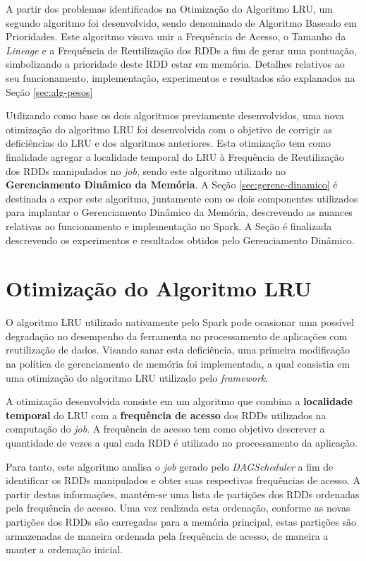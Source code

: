 A partir dos problemas identificados na Otimização do Algoritmo LRU, um segundo algoritmo foi desenvolvido, sendo denominado de Algoritmo Baseado em Prioridades. Este algoritmo visava unir a Frequência de Acesso, o Tamanho da \textit{Lineage} e a Frequência de Reutilização dos RDDs a fim de gerar uma pontuação, simbolizando a prioridade deste RDD estar em memória. Detalhes relativos ao seu funcionamento, implementação, experimentos e resultados são explanados na Seção \ref{sec:alg-pesos}

Utilizando como base os dois algoritmos previamente desenvolvidos, uma nova otimização do algoritmo LRU foi desenvolvida com o objetivo de corrigir as deficiências do LRU e dos algoritmos anteriores. Esta otimização tem como finalidade agregar a localidade temporal do LRU à Frequência de Reutilização dos RDDs manipulados no \textit{job}, sendo este algoritmo utilizado no \textbf{Gerenciamento Dinâmico da Memória}. A Seção \ref{sec:gerenc-dinamico} é destinada a expor este algoritmo, juntamente com os dois componentes utilizados para implantar o Gerenciamento Dinâmico da Memória, descrevendo as nuances relativas ao funcionamento e implementação no Spark. A Seção é finalizada descrevendo os experimentos e resultados obtidos pelo Gerenciamento Dinâmico.   



\section{Otimização do Algoritmo LRU} \label{sec:lru-mfu}
O algoritmo LRU utilizado nativamente pelo Spark pode ocasionar uma possível degradação no desempenho da ferramenta no processamento de aplicações com reutilização de dados. Visando sanar esta deficiência, uma primeira modificação na política de gerenciamento de memória foi implementada, a qual consistia em uma otimização do algoritmo LRU utilizado pelo \textit{framework}.

A otimização desenvolvida consiste em um algoritmo que combina a \textbf{localidade temporal} do LRU com a \textbf{frequência de acesso} dos RDDs utilizados na computação do \textit{job}. A frequência de acesso tem como objetivo descrever a quantidade de vezes a qual cada RDD é utilizado no processamento da aplicação. 

Para tanto, este algoritmo analisa o \textit{job} gerado pelo \textit{DAGScheduler} a fim de identificar os RDDs manipulados e obter suas respectivas frequências de acesso. A partir destas informações, mantém-se uma lista de partições dos RDDs ordenadas pela frequência de acesso. Uma vez realizada esta ordenação, conforme as novas partições dos RDDs são carregadas para a memória principal, estas partições são armazenadas de maneira ordenada pela frequência de acesso, de maneira a manter a ordenação inicial.

